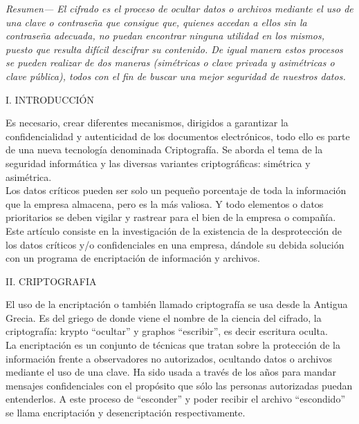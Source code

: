 \documentclass[9pt,24pt,twocolumn]{article}
\author{Correa Barcos Valentina, Pajaro Daniel, Restrepo Aguilera Yulissa
\\
\\
\textit{Facultad de Ingeniería, Universidad Tecnológica de Bolívar}
\\
{\textit{Cartagena, Bolívar}}
\\
\\{\small {valencorreabarco@hotmail.com}}
\\{\small {yulissatatiana@gmail.com}}
}
\date {}
{\title{{\Huge ENCRIPTACIÓN Y DESENCRIPTACIÓN DE DATOS}}}
\begin{document}
\maketitle

\emph{Resumen— El cifrado es el proceso de ocultar datos o archivos mediante el uso de una clave o contraseña que consigue que, quienes accedan a ellos sin la contraseña adecuada, no puedan encontrar ninguna utilidad en los mismos, puesto que resulta difícil descifrar su contenido. De igual manera estos procesos se pueden realizar de dos maneras (simétricas o clave privada y asimétricas o clave pública), todos con el fin de buscar una mejor seguridad de nuestros datos.}
\\

\begin{center}
{I. INTRODUCCIÓN}
\end{center}

{Es necesario, crear diferentes mecanismos, dirigidos a garantizar la confidencialidad y autenticidad de los documentos electrónicos, todo ello es parte de una nueva tecnología denominada Criptografía. Se aborda el tema de la seguridad informática y las diversas variantes criptográficas: simétrica y asimétrica.}
\\

{Los datos críticos pueden ser solo un pequeño porcentaje de toda la información que la empresa almacena, pero es la más valiosa. Y todo elementos o datos prioritarios se deben vigilar y rastrear para el bien de la empresa o compañía.}
\\

{Este artículo consiste en la investigación de la existencia de la desprotección de los datos críticos y/o confidenciales en una empresa, dándole su debida solución con un programa de encriptación de información y archivos.}
\\

\begin{center}
{II. CRIPTOGRAFIA}
\end{center}

{El uso de la encriptación o también llamado criptografía se usa desde la Antigua Grecia. Es del griego de donde viene el nombre de la ciencia del cifrado, la criptografía: krypto “ocultar” y graphos “escribir”, es decir escritura oculta.}
\\

{La encriptación es un conjunto de técnicas que tratan sobre la protección de la información frente a observadores no autorizados, ocultando datos o archivos mediante el uso de una clave. Ha sido usada a través de los años para mandar mensajes confidenciales con el propósito que sólo las personas autorizadas puedan entenderlos. A este proceso de “esconder” y poder recibir el archivo “escondido” se llama encriptación y desencriptación respectivamente.}
\\
\end{document}
